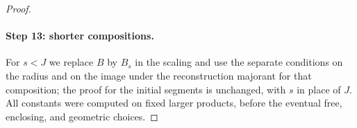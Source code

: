 \begin{proof}
\paragraph{Step 13: shorter compositions.}
For $s<J$ we replace $B$ by $B_s$ in the scaling and use the separate conditions on the radius and on the image under the reconstruction majorant for that composition; the proof for the initial segments is unchanged, with $s$ in place of $J$. All constants were computed on fixed larger products, before the eventual free, enclosing, and geometric choices.
\end{proof}
